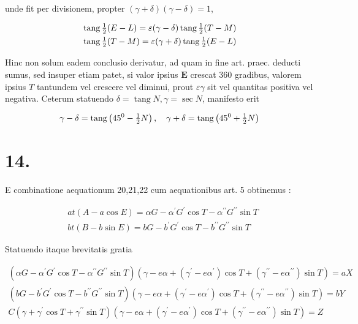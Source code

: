 \documentclass[twoside,12pt, showframe]{memoir}
\let\oldfrac\frac
\def\frac#1#2{\mathchoice{\tfrac{#1}{#2}}{\oldfrac{#1}{#2}}{\genfrac{}{}{}{2}{#1}{#2\mathstrut}}{\genfrac{}{}{}{3}{#1}{#2\mathstrut}}}
\begin{document}
unde fit per divisionem, propter \((\gamma+\delta)(\gamma-\delta)=1\),

\[
\begin{aligned}
& \operatorname{tang} \frac{1}{2}(E-L)=\varepsilon(\gamma-\delta) \operatorname{tang} \frac{1}{2}(T-M) \\
& \operatorname{tang} \frac{1}{2}(T-M)=\varepsilon(\gamma+\delta) \operatorname{tang} \frac{1}{2}(E-L)
\end{aligned}
\]

Hinc non solum eadem conclusio derivatur, ad quam in fine art. praec. deducti sumus, sed insuper etiam patet, si valor ipsius \(\boldsymbol{E}\) crescat 360 gradibus, valorem ipsius \(T\) tantundem vel crescere vel diminui, prout \(\varepsilon \gamma\) sit vel quantitas positiva vel negativa. Ceterum statuendo \(\delta=\operatorname{tang} N, \gamma=\sec N\), manifesto erit

\[
\gamma-\delta=\operatorname{tang}\left(45^{0}-\frac{1}{2} N\right), \quad \gamma+\delta=\operatorname{tang}\left(45^{0}+\frac{1}{2} N\right)
\]

\section*{14.}
E combinatione aequationum 20,21,22 cum aequationibus art. 5 obtinemus :

\[
\begin{aligned}
& a t(A-a \cos E)=\alpha G-\alpha^{\prime} G^{\prime} \cos T-\alpha^{\prime \prime} G^{\prime \prime} \sin T \\
& b t(B-b \sin E)=b G-b^{\prime} G^{\prime} \cos T-b^{\prime \prime} G^{\prime \prime} \sin T
\end{aligned}
\]

Statuendo itaque brevitatis gratia

\[
\begin{gathered}
\left(\alpha G-\alpha^{\prime} G^{\prime} \cos T-\alpha^{\prime \prime} G^{\prime \prime} \sin T\right)\left(\gamma-e \alpha+\left(\gamma^{\prime}-e \alpha^{\prime}\right) \cos T+\left(\gamma^{\prime \prime}-e \alpha^{\prime \prime}\right) \sin T\right)=a X \\
\left(b G-b^{\prime} G^{\prime} \cos T-b^{\prime \prime} G^{\prime \prime} \sin T\right)\left(\gamma-e \alpha+\left(\gamma^{\prime}-e \alpha^{\prime}\right) \cos T+\left(\gamma^{\prime \prime}-e \alpha^{\prime \prime}\right) \sin T\right)=b Y \\
C\left(\gamma+\gamma^{\prime} \cos T+\gamma^{\prime \prime} \sin T\right)\left(\gamma-e \alpha+\left(\gamma^{\prime}-e \alpha^{\prime}\right) \cos T+\left(\gamma^{\prime \prime}-e \alpha^{\prime \prime}\right) \sin T\right)=Z
\end{gathered}
\]
\end{document}
